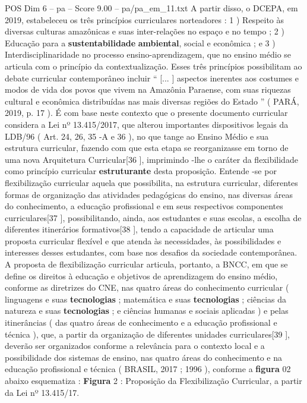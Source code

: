 \begin{textsample}{POS Dim 6 – pa – Score 9.00 – pa/pa\_em\_11.txt}
A partir disso, o DCEPA, em 2019, estabeleceu os três princípios curriculares norteadores : 1 ) Respeito às diversas culturas amazônicas e suas inter-relações no espaço e no tempo ; 2 ) Educação para a \textbf{sustentabilidade} \textbf{ambiental}, social e econômica ; e 3 ) Interdisciplinaridade no processo ensino-aprendizagem, que no ensino médio se articula com o princípio da contextualização.
Esses três princípios possibilitam ao debate curricular contemporâneo incluir “ [... ] aspectos inerentes aos costumes e modos de vida dos povos que vivem na Amazônia Paraense, com suas riquezas cultural e econômica distribuídas nas mais diversas regiões do Estado ” ( PARÁ, 2019, p. 17 ).
É com base neste contexto que o presente documento curricular considera a Lei nº 13.415/2017, que alterou importantes dispositivos legais da LDB/96 ( Art. 24, 26, 35 -A e 36 ), no que tange ao Ensino Médio e sua estrutura curricular, fazendo com que esta etapa se reorganizasse em torno de uma nova Arquitetura Curricular[36 ], imprimindo -lhe o caráter da flexibilidade como princípio curricular \textbf{estruturante} desta proposição.
Entende -se por flexibilização curricular aquela que possibilita, na estrutura curricular, diferentes formas de organização das atividades pedagógicas do ensino, nas diversas áreas do conhecimento, a educação profissional e em seus respectivos componentes curriculares[37 ], possibilitando, ainda, aos estudantes e suas escolas, a escolha de diferentes itinerários formativos[38 ], tendo a capacidade de articular uma proposta curricular flexível e que atenda às necessidades, às possibilidades e interesses desses estudantes, com base nos desafios da sociedade contemporânea.
A proposta de flexibilização curricular articula, portanto, a BNCC, em que se define os direitos à educação e objetivos de aprendizagem do ensino médio, conforme as diretrizes do CNE, nas quatro áreas do conhecimento curricular ( linguagens e suas \textbf{tecnologias} ; matemática e suas \textbf{tecnologias} ; ciências da natureza e suas \textbf{tecnologias} ; e ciências humanas e sociais aplicadas ) e pelas itinerâncias ( das quatro áreas de conhecimento e a educação profissional e técnica ), que, a partir da organização de diferentes unidades curriculares[39 ], deverão ser organizados conforme a relevância para o contexto local e a possibilidade dos sistemas de ensino, nas quatro áreas do conhecimento e na educação profissional e técnica ( BRASIL, 2017 ; 1996 ), conforme a \textbf{figura} 02 abaixo esquematiza : \textbf{Figura} 2 : Proposição da Flexibilização Curricular, a partir da Lei nº 13.415/17.

\end{textsample}
